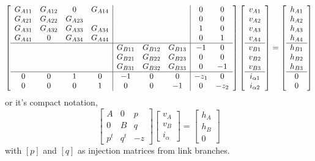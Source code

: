 \setlength{\arraycolsep}{3pt}
\begin{equation}
    \left[\begin{array}{cccc|ccc|cc}
G_{A 11} & G_{A 12} & 0 & G_{A 14} & & & & 0 & 0 \\
G_{A 21} & G_{A 22} & G_{A 23} & & & & & 0 & 0 \\
G_{A 31} & G_{A 32} & G_{A 33} & G_{A 34} & & & & 1 & 0 \\
G_{A 41} & 0 & G_{A 34} & G_{A 44} & & & & 0 & 1 \\
\hline & & & & G_{B 11} & G_{B 12} & G_{B 13} & -1 & 0 \\
& & & & G_{B 21} & G_{B 22} & G_{B 23} & 0 & 0 \\
& & & & G_{B 31} & G_{B 32} & G_{B 33} & 0 & -1 \\
\hline 0 & 0 & 1 & 0 & -1 & 0 & 0 & -z_{1} & 0 \\
0 & 0 & 0 & 1 & 0 & 0 & -1 & 0 & -z_{2}
\end{array}\right]\left[\begin{array}{c}
v_{A 1} \\
v_{A 2} \\
v_{A 3} \\
v_{A 4} \\
\hline v_{B 1} \\
v_{B 2} \\
v_{B 3} \\
\hline i_{\alpha 1} \\
i_{\alpha 2}
\end{array}\right]=\left[\begin{array}{c}
h_{A 1} \\
h_{A 2} \\
h_{A 3} \\
h_{A 4} \\
\hline h_{B 1} \\
h_{B 2} \\
h_{B 3} \\
\hline 0 \\
0
\end{array}\right]
\end{equation}
or it's compact notation,
\begin{equation}
    \left[\begin{array}{c|c|c}
A & 0 & p \\
\hline 0 & B & q \\
\hline p^{t} & q^{t} & -z
\end{array}\right]\left[\begin{array}{c}
v_{A} \\
\hline v_{B} \\
\hline i_{\alpha}
\end{array}\right]=\left[\begin{array}{c}
h_{A} \\
\hline h_{B} \\
\hline 0
\end{array}\right]
\end{equation}
with $[p]$ and $[q]$ as injection matrices from link branches.

